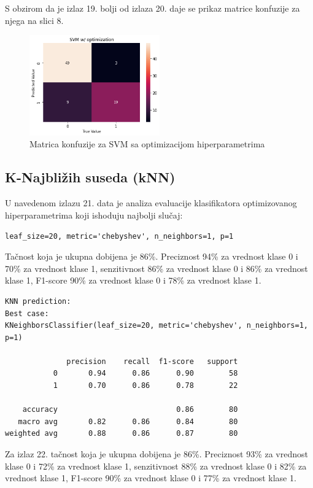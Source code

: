 \documentclass[fontsize=12bp, paper=a4]{scrarticle}
\begin{document}
S obzirom da je izlaz 19. bolji od izlaza 20. daje se prikaz matrice konfuzije za njega na slici 8.

\begin{figure}[h!]
    \centering
    \includegraphics[width=0.5\textwidth]{37.png}
    \caption{Matrica konfuzije za SVM sa optimizacijom hiperparametrima}
\end{figure}

\subsection{K-Najbližih suseda (kNN)}
U navedenom izlazu 21. data je analiza evaluacije klasifikatora 
 optimizovanog hiperparametrima koji ishoduju najbolji slučaj: 
 
 \verb|leaf_size=20, metric='chebyshev', n_neighbors=1, p=1|

Tačnost koja je ukupna dobijena je 86\%. Preciznost 94\% za vrednost klase 0 i 70\% za vrednost klase 1, senzitivnost 86\% za vrednost klase 0 i 86\% za vrednost klase 1, F1-score 90\% za vrednost klase 0 i 78\% za vrednost klase 1.

\begin{lstlisting}[caption=kNN sa optimizacijom hiperparametara]
KNN prediction:
Best case:
KNeighborsClassifier(leaf_size=20, metric='chebyshev', n_neighbors=1, p=1)

              precision    recall  f1-score   support
           0       0.94      0.86      0.90        58
           1       0.70      0.86      0.78        22

    accuracy                           0.86        80
   macro avg       0.82      0.86      0.84        80
weighted avg       0.88      0.86      0.87        80
\end{lstlisting}

Za izlaz 22. tačnost koja je ukupna dobijena je 86\%. Preciznost 93\% za vrednost klase 0 i 72\% za vrednost klase 1, senzitivnost 88\% za vrednost klase 0 i 82\% za vrednost klase 1, F1-score 90\% za vrednost klase 0 i 77\% za vrednost klase 1.
\end{document}

